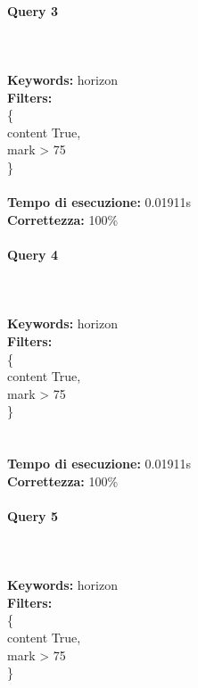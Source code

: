 \documentclass[12pt]{article}
\begin{document}
\paragraph{\LARGE{Query 3}} ~ \\ \\

\noindent \textbf{Keywords: } horizon \\
\textbf{Filters: } \\
\indent \{ \\
\indent \indent content True, \\
\indent \indent mark > 75 \\
\indent \} \\\\


\textbf{Tempo di esecuzione:} 0.01911s \\
\textbf{Correttezza:} 100\% \pagebreak

\paragraph{Query 4} ~ \\ \\

\noindent \textbf{Keywords: } horizon \\
\textbf{Filters: } \\
\indent \{ \\
\indent \indent content True, \\
\indent \indent mark > 75 \\
\indent \} \\\\\\


\noindent
\textbf{Tempo di esecuzione:} 0.01911s \\
\textbf{Correttezza:} 100\% \pagebreak

\paragraph{Query 5} ~ \\ \\

\noindent \textbf{Keywords: } horizon \\
\textbf{Filters: } \\
\indent \{ \\
\indent \indent content True, \\
\indent \indent mark > 75 \\
\indent \} \\\\\\
\end{document}
